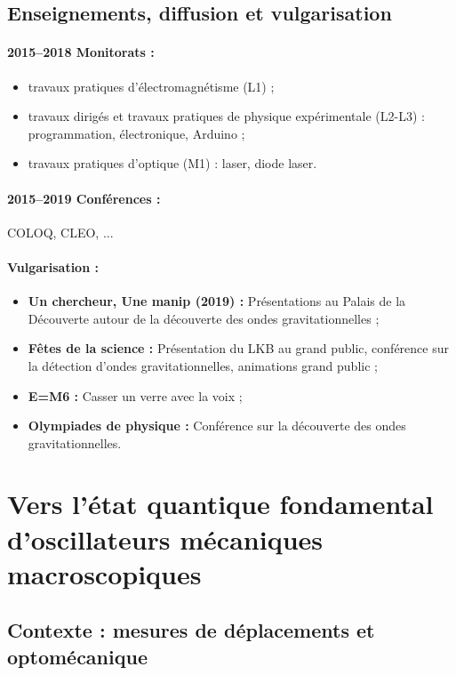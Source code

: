 \documentclass[12pt,a4paper]{article}
\begin{document}
\subsection{Enseignements, diffusion et vulgarisation}

\paragraph{2015--2018 Monitorats :}
\begin{itemize}
\item travaux pratiques d'électromagnétisme (L1) ;
\item travaux dirigés et travaux pratiques de physique expérimentale (L2-L3) : programmation, électronique, Arduino ;
\item travaux pratiques d'optique (M1) : laser, diode laser.
\end{itemize}

\paragraph{2015--2019 Conférences :} COLOQ, CLEO, ... 

\paragraph{Vulgarisation :}
\begin{itemize}
\item \textbf{Un chercheur, Une manip (2019) :} Présentations au Palais de la Découverte autour de la découverte des ondes gravitationnelles ;
\item \textbf{Fêtes de la science :} Présentation du LKB au grand public, conférence sur la détection d'ondes gravitationnelles, animations grand public ;
\item \textbf{E=M6 :} Casser un verre avec la voix ;
\item \textbf{Olympiades de physique :} Conférence sur la découverte des ondes gravitationnelles.
\end{itemize}

\section{Vers l'état quantique fondamental d'oscillateurs mécaniques macroscopiques}

\subsection{Contexte : mesures de déplacements et optomécanique}
\end{document}
